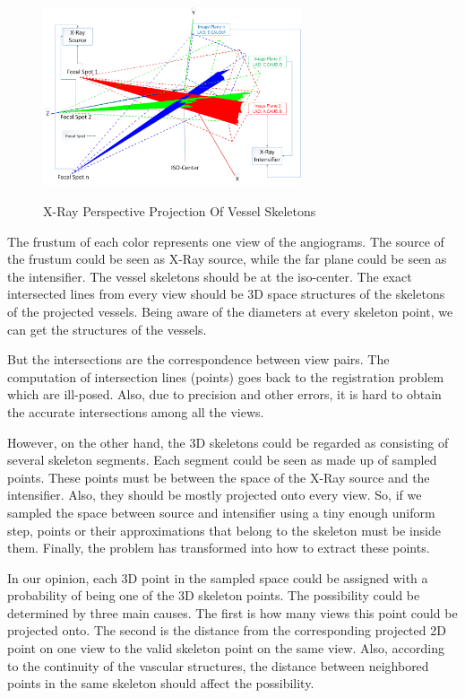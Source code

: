 \begin{figure}
 \centering
  \includegraphics[width=3.0in]{x_ray_work.png}\\
  \caption{X-Ray Perspective Projection Of Vessel Skeletons}\label{fig:xray_work_way}
\end{figure}

The frustum of each color represents one view of the angiograms. The
source of the frustum could be seen as X-Ray source, while the far
plane could be seen as the intensifier. The vessel skeletons should be
at the iso-center. The exact intersected lines from every view should
be 3D space structures of the skeletons of the projected vessels.
Being aware of the diameters at every skeleton point, we can get the
structures of the vessels.

But the intersections are the correspondence between view pairs. The
computation of intersection lines (points) goes back to the
registration problem which are ill-posed. Also, due to precision and
other errors, it is hard to obtain the accurate intersections among
all the views.

However, on the other hand, the 3D skeletons could be regarded as
consisting of several skeleton segments. Each segment could be seen as
made up of sampled points. These points must be between the space of
the X-Ray source and the intensifier. Also, they should be mostly
projected onto every view.  So, if we sampled the space between source
and intensifier using a tiny enough uniform step, points or their
approximations that belong to the skeleton must be inside them.
Finally, the problem has transformed into how to extract these points.

In our opinion, each 3D point in the sampled space could be assigned
with a probability of being one of the 3D skeleton points. The
possibility could be determined by three main causes.
The first is how many views this point could be
projected onto. The second is the distance from the corresponding projected 2D
point on one view to the valid skeleton point on the same view.
Also, according to the continuity of the vascular structures,
the distance between neighbored points in the same skeleton should affect the possibility.

